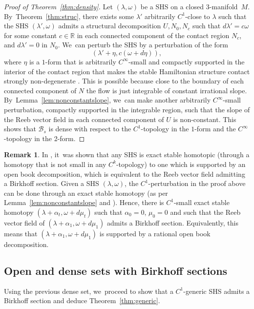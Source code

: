 \documentclass[10pt]{amsart}
\newcommand{\threemanifold}{$3$\nobreakdash-mani\-fold\xspace}
\theoremstyle{definition}
\newtheorem{Remark}[theorem]{Remark}
\begin{document}
\begin{proof}[Proof of Theorem~\ref{thm:density}]
Let $(\lambda,\omega)$ be a SHS on a closed \threemanifold~$M$. By~Theorem~\ref{thm:struc}, there exists some $\lambda'$ arbitrarily $C^1$-close to $\lambda$ such that the SHS $(\lambda',\omega)$ admits a structural decomposition $U, N_0, N_c$ such that $d\lambda'=c\omega$ for some constant $c\in \mathbb{R}$ in each connected component of the contact region $N_c$, and $d\lambda'=0$ in $N_0$. We~can perturb the SHS by a perturbation of the form
\[
(\lambda'+ \eta, c(\omega+d\eta)),
\]
where $\eta$ is a $1$-form that is arbitrarily $C^\infty$-small and compactly supported in the interior of the contact region that makes the stable Hamiltonian structure contact strongly non-degenerate \cite{CM, Ro, Pe}. This is possible because close to the boundary of each connected component of $N$ the flow is just integrable of constant irrational slope. By~Lemma~\ref{lem:nonconstantslope}, we~can make another arbitrarily $C^\infty$-small perturbation, compactly supported in the integrable region, such that the slope of the Reeb vector field in each connected component of $U$ is non-constant. This shows that $\mathcal{B}_s$ is dense with respect to the $C^1$-topology in the $1$-form and the $C^\infty$-topology in the 2-form.
\end{proof}

\begin{Remark}\label{rm:rat}
In \cite{CV0}, it~was shown that any SHS is exact stable homotopic (through a homotopy that is not small in any $C^k$-topology) to one which is supported by an open book decomposition, which is equivalent to the Reeb vector field admitting a Birkhoff section. Given a SHS $(\lambda, \omega)$, the $C^1$-perturbation in the proof above can be done through an exact stable homotopy (as per Lemma~\ref{lem:nonconstantslope} and \cite[Th.\,4.6]{CV1}). Hence, there is $C^1$-small exact stable homotopy $(\lambda+\alpha_t, \omega+ d\mu_t)$ such that $\alpha_0=0$, $\mu_0=0$ and such that the Reeb vector field of $(\lambda+\alpha_1, \omega+d\mu_1)$ admits a Birkhoff section. Equivalently, this means that $(\lambda+\alpha_1,\omega+d\mu_1)$ is supported by a rational open book decomposition.
\end{Remark}

\subsection{Open and dense sets with Birkhoff sections}
Using the previous dense set, we~proceed to show that a $C^1$-generic SHS admits a Birkhoff section and deduce Theorem~\ref{thm:generic}.
\end{document}
